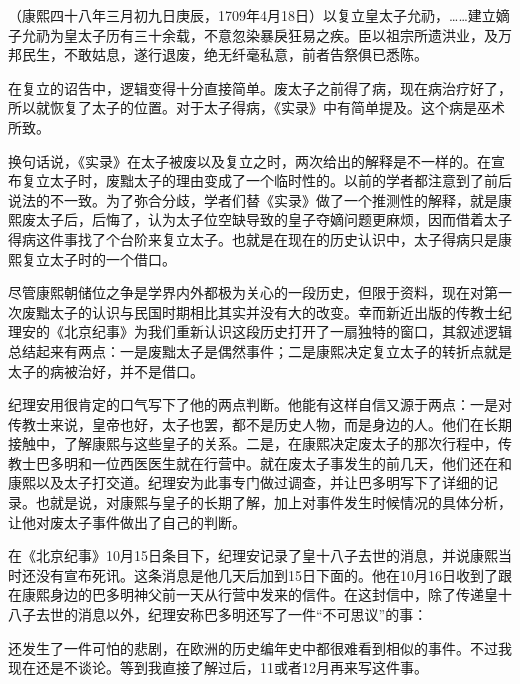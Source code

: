 
\begin{bookquote}（康熙四十八年三月初九日庚辰，1709年4月18日）以复立皇太子允礽，……建立嫡子允礽为皇太子历有三十余载，不意忽染暴戾狂易之疾。臣以祖宗所遗洪业，及万邦民生，不敢姑息，遂行退废，绝无纤毫私意，前者告祭俱已悉陈。\end{bookquote}


在复立的诏告中，逻辑变得十分直接简单。废太子之前得了病，现在病治疗好了，所以就恢复了太子的位置。对于太子得病，《实录》中有简单提及。这个病是巫术所致。



换句话说，《实录》在太子被废以及复立之时，两次给出的解释是不一样的。在宣布复立太子时，废黜太子的理由变成了一个临时性的。以前的学者都注意到了前后说法的不一致。为了弥合分歧，学者们替《实录》做了一个推测性的解释，就是康熙废太子后，后悔了，认为太子位空缺导致的皇子夺嫡问题更麻烦，因而借着太子得病这件事找了个台阶来复立太子。也就是在现在的历史认识中，太子得病只是康熙复立太子时的一个借口。



尽管康熙朝储位之争是学界内外都极为关心的一段历史，但限于资料，现在对第一次废黜太子的认识与民国时期相比其实并没有大的改变。幸而新近出版的传教士纪理安的《北京纪事》为我们重新认识这段历史打开了一扇独特的窗口，其叙述逻辑总结起来有两点：一是废黜太子是偶然事件；二是康熙决定复立太子的转折点就是太子的病被治好，并不是借口。



纪理安用很肯定的口气写下了他的两点判断。他能有这样自信又源于两点：一是对传教士来说，皇帝也好，太子也罢，都不是历史人物，而是身边的人。他们在长期接触中，了解康熙与这些皇子的关系。二是，在康熙决定废太子的那次行程中，传教士巴多明和一位西医医生就在行营中。就在废太子事发生的前几天，他们还在和康熙以及太子打交道。纪理安为此事专门做过调查，并让巴多明写下了详细的记录。也就是说，对康熙与皇子的长期了解，加上对事件发生时候情况的具体分析，让他对废太子事件做出了自己的判断。



在《北京纪事》10月15日条目下，纪理安记录了皇十八子去世的消息，并说康熙当时还没有宣布死讯。这条消息是他几天后加到15日下面的。他在10月16日收到了跟在康熙身边的巴多明神父前一天从行营中发来的信件。在这封信中，除了传递皇十八子去世的消息以外，纪理安称巴多明还写了一件“不可思议”的事：



\begin{bookquote}还发生了一件可怕的悲剧，在欧洲的历史编年史中都很难看到相似的事件。不过我现在还是不谈论。等到我直接了解过后，11或者12月再来写这件事。\end{bookquote}

